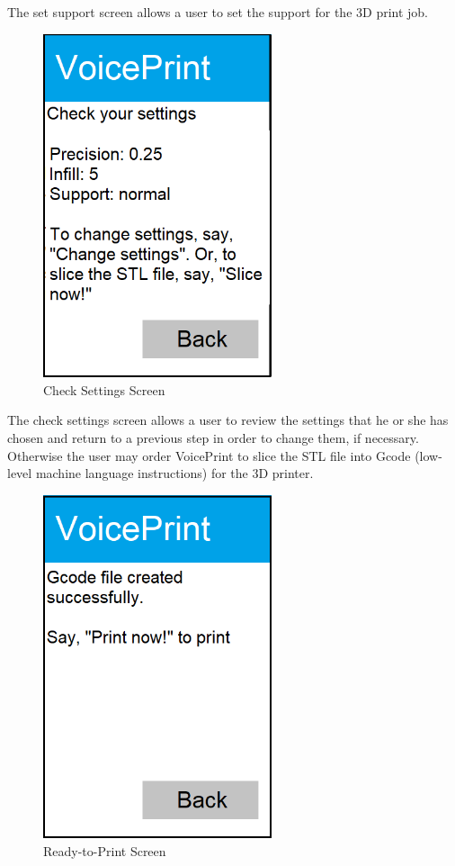 The set support screen allows a user to set the support for the 3D print job.

\newpage

\begin{figure}[h!]
	\centering
   	\includegraphics[width=0.60\textwidth]{images/Activity5.png}
   	\caption{Check Settings Screen}
\end{figure}

The check settings screen allows a user to review the settings that he or she has chosen and return to a previous step in order to change them, if necessary. Otherwise the user may order VoicePrint to slice the STL file into Gcode (low-level machine language instructions) for the 3D printer.

\newpage

\begin{figure}[h!]
	\centering
   	\includegraphics[width=0.60\textwidth]{images/Activity6a.png}
   	\caption{Ready-to-Print Screen}
\end{figure}

